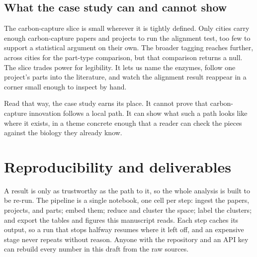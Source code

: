 \documentclass[12pt,a4paper]{article}
\begin{document}
	
	\subsection{What the case study can and cannot show}
	
	The carbon-capture slice is small wherever it is tightly defined. Only
	\statCcAlignNCities{} cities carry enough carbon-capture papers and projects to run
	the alignment test, too few to support a statistical argument on their own. The
	broader tagging reaches further, across \statCcPartsNCities{} cities for the
	part-type comparison, but that comparison returns a null. The slice trades power for
	legibility. It lets us name the enzymes, follow one project's parts into the
	literature, and watch the alignment result reappear in a corner small enough to
	inspect by hand.
	
	Read that way, the case study earns its place. It cannot prove that carbon-capture
	innovation follows a local path. It can show what such a path looks like where it
	exists, in a theme concrete enough that a reader can check the pieces against the
	biology they already know.
	
	\section{Reproducibility and deliverables}
	
	A result is only as trustworthy as the path to it, so the whole analysis is built
	to be re-run. The pipeline is a single notebook, one cell per step: ingest the
	papers, projects, and parts; embed them; reduce and cluster the space; label the
	clusters; and export the tables and figures this manuscript reads. Each step caches
	its output, so a run that stops halfway resumes where it left off, and an expensive
	stage never repeats without reason. Anyone with the repository and an API key can
	rebuild every number in this draft from the raw sources.
	
\end{document}
